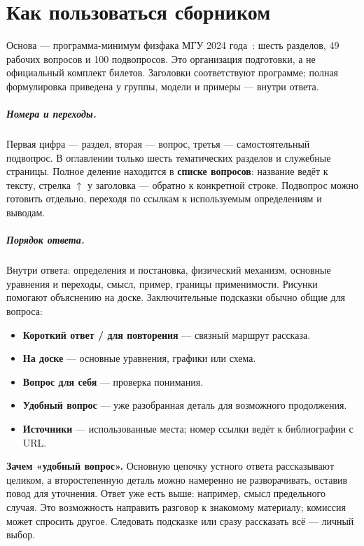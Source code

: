 \chapter*{Как пользоваться сборником}
Основа --- программа-минимум физфака МГУ 2024 года~\cite{program2024}: шесть разделов, 49 рабочих вопросов и 100 подвопросов. Это организация подготовки, а не официальный комплект билетов. Заголовки соответствуют программе; полная формулировка приведена у группы, модели и примеры --- внутри ответа.

\paragraph{Номера и переходы.}
Первая цифра --- раздел, вторая --- вопрос, третья --- самостоятельный подвопрос. В оглавлении только шесть тематических разделов и служебные страницы. Полное деление находится в \textbf{списке вопросов}: название ведёт к тексту, стрелка $\uparrow$ у заголовка --- обратно к конкретной строке. Подвопрос можно готовить отдельно, переходя по ссылкам к используемым определениям и выводам.

\paragraph{Порядок ответа.}
Внутри ответа: определения и постановка, физический механизм, основные уравнения и переходы, смысл, пример, границы применимости. Рисунки помогают объяснению на доске. Заключительные подсказки обычно общие для вопроса:
\begin{itemize}
\item \textbf{Короткий ответ / для повторения} --- связный маршрут рассказа.
\item \textbf{На доске} --- основные уравнения, графики или схема.
\item \textbf{Вопрос для себя} --- проверка понимания.
\item \textbf{Удобный вопрос} --- уже разобранная деталь для возможного продолжения.
\item \textbf{Источники} --- использованные места; номер ссылки ведёт к библиографии с URL.
\end{itemize}
\textbf{Зачем «удобный вопрос».} Основную цепочку устного ответа рассказывают целиком, а второстепенную деталь можно намеренно не разворачивать, оставив повод для уточнения. Ответ уже есть выше: например, смысл предельного случая. Это возможность направить разговор к знакомому материалу; комиссия может спросить другое. Следовать подсказке или сразу рассказать всё --- личный выбор.

